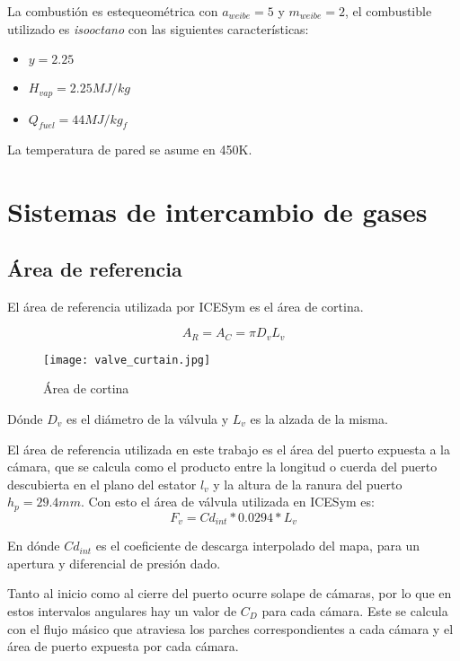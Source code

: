 La combustión es estequeométrica con $a_{weibe}=5$ y $m_{weibe}=2$, el combustible utilizado
es \emph{isooctano} con las siguientes características:
\begin{itemize}
    \item $y = 2.25$
    \item $H_{vap} = 2.25 MJ/kg$
    \item $Q_{fuel} = 44 MJ/kg_f$
\end{itemize}

La temperatura de pared se asume en 450K.


\section{Sistemas de intercambio de gases}
%
\subsection{Área de referencia}
%
El área de referencia utilizada por ICESym es el área de cortina.

\begin{equation}
  \label{eq:Ar}
  A_R = A_C = \pi D_v L_v
\end{equation}

\begin{figure}
  \centering
  \texttt{[image: valve\_curtain.jpg]}
  \caption{Área de cortina}
  \label{fig:area_cortina}
\end{figure}

Dónde $D_v$ es el diámetro de la válvula y $L_v$ es la alzada de la misma.

El área de referencia utilizada en este trabajo es el área del puerto expuesta a
la cámara, que se calcula como el producto entre la longitud o cuerda del puerto
descubierta en el plano del estator $l_v$ y la altura de la ranura del puerto
$h_p=29.4mm$.
%
Con esto el área de válvula utilizada en ICESym es:
\begin{equation}
  \label{eq:fv}
  F_v = Cd_{int}*0.0294*L_v
\end{equation}

En dónde $Cd_{int}$ es el coeficiente de descarga interpolado del mapa, para un apertura
y diferencial de presión dado.


%
Tanto al inicio como al cierre del puerto ocurre solape de cámaras, por lo que
en estos intervalos angulares hay un valor de $C_D$ para cada cámara.
%
Este se calcula con el flujo másico que atraviesa los parches correspondientes
a cada cámara y el área de puerto expuesta por cada cámara.

